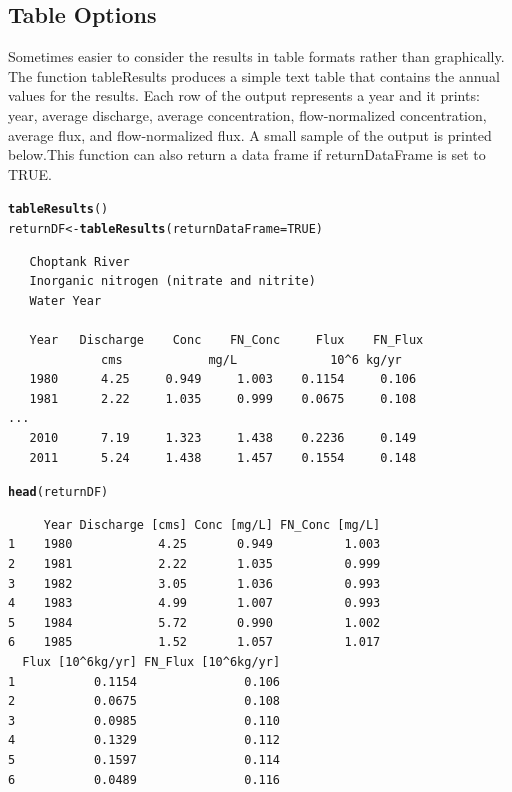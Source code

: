 \documentclass[a4paper,11pt]{article}\usepackage{graphicx, color}
\makeatletter
\newcommand{\hlfunctioncall}[1]{\textcolor[rgb]{0.501960784313725,0,0.329411764705882}{\textbf{#1}}}%
\newenvironment{kframe}{%
 \def\at@end@of@kframe{}%
 \ifinner\ifhmode%
  \def\at@end@of@kframe{\end{minipage}}%
  \begin{minipage}{\columnwidth}%
 \fi\fi%
 \def\FrameCommand##1{\hskip\@totalleftmargin \hskip-\fboxsep
 \colorbox{shadecolor}{##1}\hskip-\fboxsep
     \hskip-\linewidth \hskip-\@totalleftmargin \hskip\columnwidth}%
 \MakeFramed {\advance\hsize-\width
   \@totalleftmargin\z@ \linewidth\hsize
   \@setminipage}}%
 {\par\unskip\endMakeFramed%
 \at@end@of@kframe}
\newenvironment{knitrout}{}{} %
\makeatother
\begin{document}
\FloatBarrier
\subsection{Table Options}
\label{sec:wrtdsTable}
Sometimes easier to consider the results in table formats rather than graphically. The function tableResults produces a simple text table that contains the annual values for the results.  Each row of the output represents a year and it prints: year, average discharge, average concentration, flow-normalized concentration, average flux, and flow-normalized flux.  A small sample of the output is printed below.This function can also return a data frame if returnDataFrame is set to TRUE.

\begin{knitrout}
\color{fgcolor}\begin{kframe}
\begin{alltt}
\hlfunctioncall{tableResults}()
returnDF <- \hlfunctioncall{tableResults}(returnDataFrame=TRUE)
\end{alltt}
\end{kframe}
\end{knitrout}


\begin{verbatim}
   Choptank River 
   Inorganic nitrogen (nitrate and nitrite)
   Water Year 

   Year   Discharge    Conc    FN_Conc     Flux    FN_Flux
             cms            mg/L             10^6 kg/yr 
   1980      4.25     0.949     1.003    0.1154     0.106
   1981      2.22     1.035     0.999    0.0675     0.108
...
   2010      7.19     1.323     1.438    0.2236     0.149
   2011      5.24     1.438     1.457    0.1554     0.148
\end{verbatim}




\begin{knitrout}
\color{fgcolor}\begin{kframe}
\begin{alltt}
\hlfunctioncall{head}(returnDF)
\end{alltt}
\begin{verbatim}
     Year Discharge [cms] Conc [mg/L] FN_Conc [mg/L]
1    1980            4.25       0.949          1.003
2    1981            2.22       1.035          0.999
3    1982            3.05       1.036          0.993
4    1983            4.99       1.007          0.993
5    1984            5.72       0.990          1.002
6    1985            1.52       1.057          1.017
  Flux [10^6kg/yr] FN_Flux [10^6kg/yr]
1           0.1154               0.106
2           0.0675               0.108
3           0.0985               0.110
4           0.1329               0.112
5           0.1597               0.114
6           0.0489               0.116
\end{verbatim}
\end{kframe}
\end{knitrout}
\end{document}
